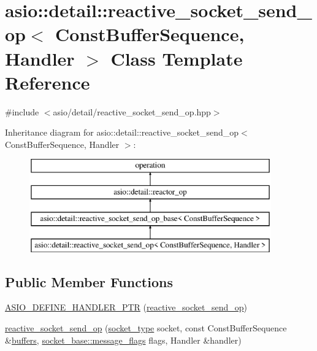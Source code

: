 \hypertarget{classasio_1_1detail_1_1reactive__socket__send__op}{}\section{asio\+:\+:detail\+:\+:reactive\+\_\+socket\+\_\+send\+\_\+op$<$ Const\+Buffer\+Sequence, Handler $>$ Class Template Reference}
\label{classasio_1_1detail_1_1reactive__socket__send__op}


{\ttfamily \#include $<$asio/detail/reactive\+\_\+socket\+\_\+send\+\_\+op.\+hpp$>$}

Inheritance diagram for asio\+:\+:detail\+:\+:reactive\+\_\+socket\+\_\+send\+\_\+op$<$ Const\+Buffer\+Sequence, Handler $>$\+:\begin{figure}[H]
\begin{center}
\leavevmode
\includegraphics[height=4.000000cm]{classasio_1_1detail_1_1reactive__socket__send__op}
\end{center}
\end{figure}
\subsection*{Public Member Functions}
\begin{DoxyCompactItemize}
\item 
\hyperlink{classasio_1_1detail_1_1reactive__socket__send__op_a827650385f6226ad7084f2dfa1828d00}{A\+S\+I\+O\+\_\+\+D\+E\+F\+I\+N\+E\+\_\+\+H\+A\+N\+D\+L\+E\+R\+\_\+\+P\+T\+R} (\hyperlink{classasio_1_1detail_1_1reactive__socket__send__op}{reactive\+\_\+socket\+\_\+send\+\_\+op})
\item 
\hyperlink{classasio_1_1detail_1_1reactive__socket__send__op_a1b0741219b5a6c6158d87bcf69cc2984}{reactive\+\_\+socket\+\_\+send\+\_\+op} (\hyperlink{namespaceasio_1_1detail_a6798c771dd84b79798b1a08150706ea9}{socket\+\_\+type} socket, const Const\+Buffer\+Sequence \&\hyperlink{group__async__read_ga54dede45c3175148a77fe6635222c47d}{buffers}, \hyperlink{classasio_1_1socket__base_ac3cf77465dfedfe1979b5415cf32cc94}{socket\+\_\+base\+::message\+\_\+flags} flags, Handler \&handler)
\end{DoxyCompactItemize}
